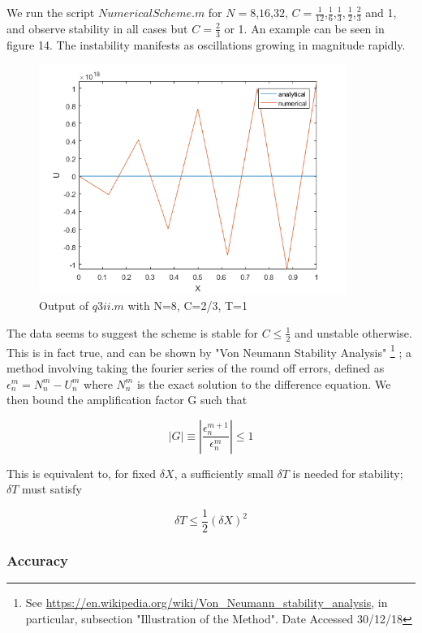 \documentclass[10pt,a4paper]{report}
\begin{document}
We run the script $NumericalScheme.m$ for $N=8$,$16$,$32$, $C=\frac{1}{12}$,$\frac{1}{6}$,$\frac{1}{3},\frac{1}{2}$,$\frac{2}{3}$ and 1, and observe stability in all cases but $C=\frac{2}{3}$ or 1. An example can be seen in figure 14. The instability manifests as oscillations growing in magnitude rapidly.

\begin{figure}[h]
\centering
\includegraphics[width=10cm]{unstable}
\caption{Output of $q3ii.m$ with N=8, C=2/3, T=1}
\end{figure}

The data seems to suggest the scheme is stable for $C\leq\frac{1}{2}$ and unstable otherwise. This is in fact true, and can be shown by "Von Neumann Stability Analysis"  \footnote{
See \url{https://en.wikipedia.org/wiki/Von_Neumann_stability_analysis}, in particular, subsection "Illustration of the Method". Date Accessed 30/12/18}
; a method involving taking the fourier series of the round off errors, defined as 
  $\epsilon_n^m = N_n^m - U_n^m$ where $N_n^m$ is the exact solution to the difference equation. We then bound the amplification factor G such that 
  
\begin{equation*} 
|G| \equiv |\frac{\epsilon_n^{m+1}}{\epsilon_n^m}| \leq 1
\end{equation*}

This is equivalent to, for fixed $\delta X$, a sufficiently small $\delta T$ is needed for stability; $\delta T$ must satisfy

\begin{equation*}
\delta T \leq \frac{1}{2}(\delta X)^2
\end{equation*}

\subsubsection{Accuracy}
\end{document}
